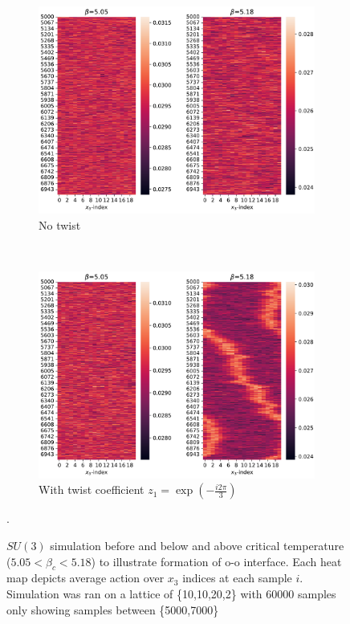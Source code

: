 \documentclass[english,twoside,openright]{UH_TCM_MSc}
\begin{document}
\begin{figure}[htpb]
    \centering
    \begin{subfigure}[t]{\textwidth}
        \centering
        \includegraphics[height=0.45\textheight]{final_plots/misc/notwist_heat_map.pdf}
        \caption{No twist}
    \end{subfigure}\\
    \begin{subfigure}[t]{\textwidth}
        \centering
        \includegraphics[height=0.45\textheight]{final_plots/misc/twist_heat_map.pdf}
        \caption{With twist coefficient $z_1 =\exp(-\frac{i2\pi}{3})$}
        \label{fig:twist_z1_action}
    \end{subfigure}
    \caption{$SU(3)$ simulation before and below and above critical temperature ($5.05 < \beta_c < 5.18$) to illustrate formation of o-o interface. Each heat map depicts average action over $x_3$ indices at each sample $i$. Simulation was ran on a lattice of \{10,10,20,2\} with 60000 samples only showing samples between \{5000,7000\}}.
    \label{fig:surface_move}
\end{figure}
\end{document}
